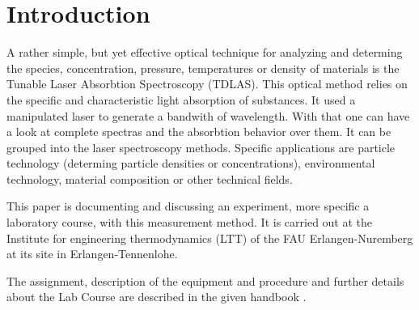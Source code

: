 
\chapter{Introduction}
\label{chap:intro}

A rather simple, but yet effective optical technique for analyzing and determing the species, concentration, pressure, temperatures or density of materials is the Tunable Laser Absorbtion Spectroscopy (TDLAS). This optical method relies on the specific and characteristic light absorption of substances. It used a manipulated laser to generate a bandwith of wavelength. With that one can have a look at complete spectras and the absorbtion behavior over them. It can be grouped into the laser spectroscopy methods. Specific applications are particle technology (determing particle densities or concentrations), environmental technology, material composition or other technical fields.

This paper is documenting and discussing an experiment, more specific a laboratory course, with this measurement method. It is carried out at the Institute for engineering thermodynamics (LTT) of the FAU Erlangen-Nuremberg at its site in Erlangen-Tennenlohe.

The assignment, description of the equipment and procedure and further details about the Lab Course are described in the given handbook \autocite{klevanskyTDLASTunableLaser2021}.

\vspace{1cm}

